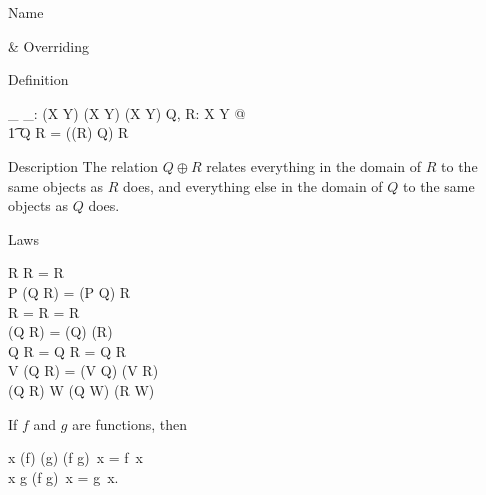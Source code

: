 \begin{manpage}\label{p:1075}
\item[Name]
\begin{name}
     \oplus & Overriding\symdex{$\oplus$}
\end{name}

\item[Definition]
\begin{gendef}[X,Y]
        \_ \oplus \_: (X \rel Y) \cross (X \rel Y) \fun (X \rel Y)
\where
        \forall Q, R: X \rel Y @ \\
\t1         Q \oplus R = ((\dom R) \ndres Q) \cup R
\end{gendef}

\item[Description]
The relation $Q \oplus R$ relates everything in the domain of $R$ to
the same objects as $R$ does, and everything else in the domain of
$Q$ to the same objects as $Q$ does.

\item[Laws]
\begin{laws}
        R \oplus R = R \\
        P \oplus (Q \oplus R) = (P \oplus Q) \oplus R \\
        \empty \oplus R = R \oplus \empty = R \\
\also
        \dom (Q \oplus R) = (\dom Q) \cup (\dom R) \\
        \dom Q \cap \dom R = \empty \implies Q \oplus R = Q \cup R \\
\also
        V \dres (Q \oplus R) = (V \dres Q) \oplus (V \dres R) \\
        (Q \oplus R) \rres W \subseteq (Q \rres W) \oplus (R \rres W)
\end{laws}
If $f$ and $g$ are functions, then
\begin{laws}
        x \in (\dom f) \setminus (\dom g) \implies (f \oplus g)~x = f~x \\
        x \in \dom g \implies (f \oplus g)~x = g~x.
\end{laws}
\end{manpage}
\def\reflexivetransitiveclosure{reflexive--transitive closure}
